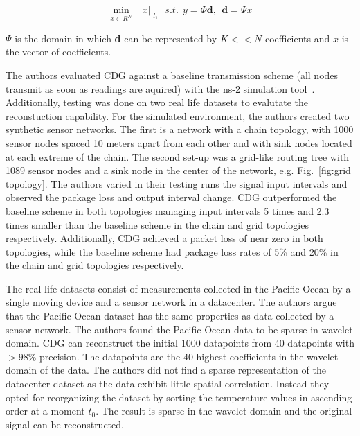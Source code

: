 $$
\displaystyle{\min_{x\in R^N} \ ||x||_{l_1}}  \ \ \   s.t.  \ \  y = \Phi \textbf{d} , \ \ 
\textbf{d}  = \Psi x
$$

$ \Psi $ is the domain in which \textbf{d} can be represented by $ K << N
$ coefficients and $ x $ is the vector of coefficients.

The authors evaluated \ac{CDG} against a baseline transmission scheme (all
nodes transmit as soon as readings are aquired) with the ns-2 simulation
tool~\cite{bajaj1999improving}. Additionally, testing was done on two real life
datasets to evalutate the reconstuction capability. For the simulated
environment, the authors created two synthetic sensor networks. The first is a
network with a chain topology, with 1000 sensor nodes spaced 10 meters apart
from each other and with sink nodes located at each extreme of the chain. The
second set-up was a grid-like routing tree with 1089 sensor nodes and a sink
node in the center of the network, e.g. Fig.~\ref{fig:grid topology}. The
authors varied in their testing runs the signal input intervals and observed
the package loss and output interval change. \ac{CDG} outperformed the baseline
scheme in both topologies managing input intervals 5 times and 2.3 times
smaller than the baseline scheme in the chain and grid topologies respectively.
Additionally, \ac{CDG} achieved a packet loss of near zero in both topologies,
while the baseline scheme had package loss rates of 5\% and 20\% in the chain
and grid topologies respectively.

The real life datasets consist of measurements collected in the Pacific Ocean
by a single moving device and a sensor network in a datacenter. The authors
argue that the Pacific Ocean dataset has the same properties as data collected
by a sensor network. The authors found the Pacific Ocean data to be sparse in
wavelet domain. \ac{CDG} can reconstruct the initial 1000 datapoints from 40
datapoints with $ > 98\% $ precision. The datapoints are the 40 highest
coefficients in the wavelet domain of the data. The authors did not find a
sparse representation of the datacenter dataset as the data exhibit little
spatial correlation. Instead they opted for reorganizing the dataset by sorting
the temperature values in ascending order at a moment $ t_0 $. The result is
sparse in the wavelet domain and the original signal can be reconstructed.


